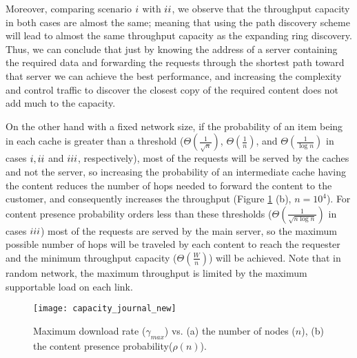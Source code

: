 \documentclass[journal]{IEEEtran}
\theoremstyle{plain}
\theoremstyle{remark}
\begin{document}
Moreover, comparing scenario $\romannumeral 1$ with $\romannumeral 2$, we observe that the throughput capacity in both cases are almost the same; meaning that using the path discovery scheme will lead to almost the same throughput capacity as the expanding ring discovery. Thus, we can conclude that just by knowing the address of a server containing the required data and forwarding the requests through the shortest path toward that server we can achieve the best performance, and increasing the complexity and control traffic to discover the closest copy of the required content does not add much to the capacity. 

On the other hand with a fixed network size, if the probability of an item being in each cache is greater than a threshold ($\Theta(\frac{1}{\sqrt{n}})$, $\Theta(\frac{1}{n})$, and $\Theta(\frac{1}{\log n})$ in cases $\romannumeral 1,\romannumeral 2$ and $\romannumeral 3$, respectively), most of the requests will be served by the caches and not the server, so increasing the probability of an intermediate cache having the content reduces the number of hops needed to forward the content to the customer, and consequently increases the throughput (Figure \ref{fig:capacity} (b), $n=10^4$). For content presence probability orders less than these thresholds ($\Theta(\frac{1}{\sqrt{n\log n}})$ in cases $\romannumeral 3$) most of the requests are served by the main server, so the maximum possible number of hops will be traveled by each content to reach the requester and the minimum throughput capacity ($\Theta(\frac{W}{n})$) will be achieved. Note that in random network, the maximum throughput is limited by the maximum supportable load on each link.

\begin{figure}[http]
    \center
\texttt{[image: capacity\_journal\_new]}\\
      \caption{Maximum download rate ($\gamma_{max}$) vs. (a) the number of nodes ($n$), (b) the content presence probability($\rho(n)$).}
    \label{fig:capacity}
\end{figure}

\begin{comment}
Furthermore, if the content availability increases with network growth, higher throughput capacities may be achievable. For example in scenario $\romannumeral 3$ if $\rho(n)=\Theta(\frac{\log n}{\log n+\log \log n})$, then the resulting throughput will be $\gamma_{max}=\Theta(\frac{W}{\log \log n})$ which is much higher than $\Theta(\frac{W}{\log n})$. However, noting that according to Theorem \ref{thm:02}, $\rho(n)$ is upper bounded by some values, the achievable capacity will be upper bounded by $\Theta(\frac{W\sqrt{n}\log \log n}{\log n})$ ($\romannumeral 1$) and $\Theta(W\frac{\log \log \log n}{\log \log n})$ ($\romannumeral 3$). 
\end{comment}
\end{document}
